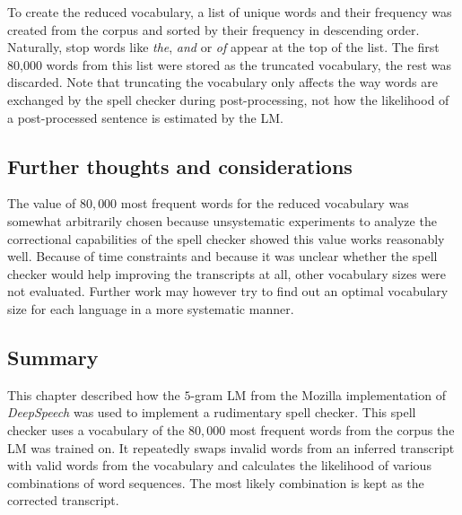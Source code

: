 To create the reduced vocabulary, a list of unique words and their frequency was created from the corpus and sorted by their frequency in descending order. Naturally, stop words like \textit{the}, \textit{and} or \textit{of} appear at the top of the list. The first 80,000 words from this list were stored as the truncated vocabulary, the rest was discarded. Note that truncating the vocabulary only affects the way words are exchanged by the spell checker during post-processing, not how the likelihood of a post-processed sentence is estimated by the \ac{LM}.

\subsection{Further thoughts and considerations}

The value of $80,000$ most frequent words for the reduced vocabulary was somewhat arbitrarily chosen because unsystematic experiments to analyze the correctional capabilities of the spell checker showed this value works reasonably well. Because of time constraints and because it was unclear whether the spell checker would help improving the transcripts at all, other vocabulary sizes were not evaluated. Further work may however try to find out an optimal vocabulary size for each language in a more systematic manner.

\subsection{Summary}

This chapter described how the $5$-gram \ac{LM} from the Mozilla implementation of \textit{DeepSpeech} was used to implement a rudimentary spell checker. This spell checker uses a vocabulary of the $80,000$ most frequent words from the corpus the \ac{LM} was trained on. It repeatedly swaps invalid words from an inferred transcript with valid words from the vocabulary and calculates the likelihood of various combinations of word sequences. The most likely combination is kept as the corrected transcript.